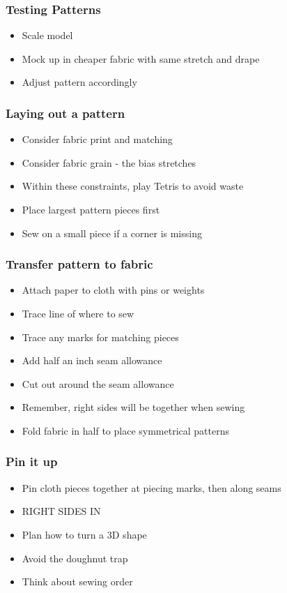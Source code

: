 \documentclass{beamer}
\begin{document}
\begin{frame}[fragile]
\frametitle{Testing Patterns}
\begin{itemize}[<+(1)->]
\item Scale model
\item Mock up in cheaper fabric with same stretch and drape
\item Adjust pattern accordingly
\end{itemize}
\end{frame}

\begin{frame}[fragile]
\frametitle{Laying out a pattern}
\begin{itemize}[<+(1)->]
\item Consider fabric print and matching
\item Consider fabric grain - the bias stretches
\item Within these constraints, play Tetris to avoid waste
\item Place largest pattern pieces first
\item Sew on a small piece if a corner is missing
\end{itemize}
\end{frame}

\begin{frame}[fragile]
\frametitle{Transfer pattern to fabric}
\begin{itemize}[<+(1)->]
\item Attach paper to cloth with pins or weights
\item Trace line of where to sew
\item Trace any marks for matching pieces
\item Add half an inch seam allowance
\item Cut out around the seam allowance
\item Remember, right sides will be together when sewing
\item Fold fabric in half to place symmetrical patterns
\end{itemize}
\end{frame}

\begin{frame}[fragile]
\frametitle{Pin it up}
\begin{itemize}[<+(1)->]
\item Pin cloth pieces together at piecing marks, then along seams
\item RIGHT SIDES IN
\item Plan how to turn a 3D shape
\item Avoid the doughnut trap
\item Think about sewing order
\end{itemize}
\end{frame}
\end{document}
